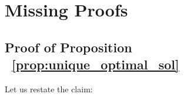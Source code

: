 








\section{Missing Proofs}\label{app:missing_proofs}

\subsection{Proof of Proposition ~\ref{prop:unique_optimal_sol}}\label{app:missing_proofs_unique_opt_sol}
Let us restate the claim:

